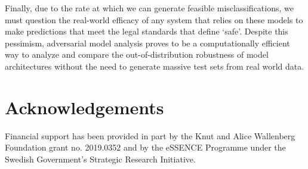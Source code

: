 \documentclass[journal]{IEEEtran}
\begin{document}
Finally, due to the rate at which we can generate feasible misclassifications, we must question the real-world efficacy of any system that relies on these models to make predictions that meet the legal standards that define `safe'. Despite this pessimism, adversarial model analysis proves to be a computationally efficient way to analyze and compare the out-of-distribution robustness of model architectures without the need to generate massive test sets from real world data.

\section{Acknowledgements}
Financial support has been provided in part by the Knut and Alice Wallenberg Foundation grant no. 2019.0352 and by the eSSENCE Programme under the Swedish Government’s Strategic Research Initiative.

\FloatBarrier



\end{document}
